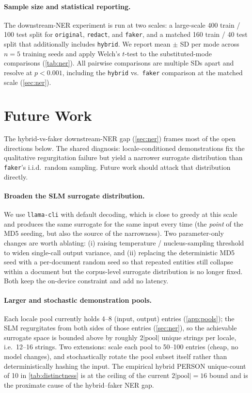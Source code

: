 \documentclass[11pt]{article}
\newcommand{\code}[1]{\texttt{#1}}
\newcommand{\faker}{\code{faker}}
\begin{document}
\paragraph{Sample size and statistical reporting.}
The downstream-NER experiment is run at two scales: a large-scale 400
train / 100 test split for \code{original}, \code{redact}, and
\code{faker}, and a matched 160 train / 40 test split that
additionally includes \code{hybrid}. We report mean $\pm$ SD per mode
across $n=5$ training seeds and apply Welch's $t$-test to the
substituted-mode comparisons (\cref{tab:ner}). All pairwise
comparisons are multiple SDs apart and resolve at $p<0.001$,
including the \code{hybrid} vs.\ \code{faker} comparison at the
matched scale (\cref{sec:ner}).

\section{Future Work}
\label{sec:future}

The hybrid-vs-faker downstream-NER gap (\cref{sec:ner}) frames most of
the open directions below. The shared diagnosis: locale-conditioned
demonstrations fix the qualitative regurgitation failure but yield a
narrower surrogate distribution than \faker{}'s i.i.d.\ random
sampling. Future work should attack that distribution directly.

\paragraph{Broaden the SLM surrogate distribution.}
We use \code{llama-cli} with default decoding, which is close to greedy
at this scale and produces the same surrogate for the same input every
time (the \emph{point} of the MD5 seeding, but also the source of the
narrowness). Two parameter-only changes are worth ablating:
(i) raising temperature / nucleus-sampling threshold to widen
single-call output variance, and (ii) replacing the deterministic MD5
seed with a per-document random seed so that repeated entities still
collapse within a document but the corpus-level surrogate distribution
is no longer fixed. Both keep the on-device constraint and add no
latency.

\paragraph{Larger and stochastic demonstration pools.}
Each locale pool currently holds 4--8 (input, output) entries
(\cref{app:pools}); the SLM regurgitates from both sides of those
entries (\cref{sec:ner}), so the achievable surrogate space is
bounded above by roughly $2|\text{pool}|$ unique strings per locale,
i.e.\ 12--16 strings. Two extensions: scale each pool to 50--100
entries (cheap, no model changes), and stochastically rotate the pool
subset itself rather than deterministically hashing the input. The
empirical hybrid PERSON unique-count of 10 in \cref{tab:distinctness}
is at the ceiling of the current $2|\text{pool}|=16$ bound and is the
proximate cause of the hybrid--faker NER gap.
\end{document}

